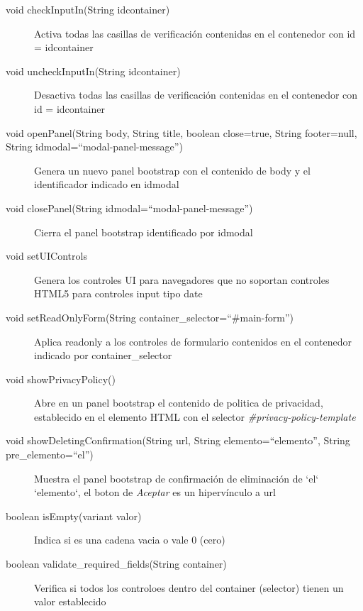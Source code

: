 \begin{description}
	\item[void checkInputIn(String idcontainer)] Activa todas las casillas de verificación contenidas en el contenedor con id = idcontainer
	\item[void uncheckInputIn(String idcontainer)] Desactiva todas las casillas de verificación contenidas en el contenedor con id = idcontainer
	\item[void openPanel(String body, String title, boolean close=true, String footer=null,]
	\item[\quad String idmodal=``modal-panel-message'')] Genera un nuevo panel bootstrap con el contenido de body y el identificador indicado en idmodal
	\item[void closePanel(String idmodal=``modal-panel-message'')] Cierra el panel bootstrap identificado por idmodal
	\item[void setUIControls] Genera los controles UI para navegadores que no soportan controles HTML5 para controles input tipo date
	\item[void setReadOnlyForm(String container\_selector=``\#main-form'')] Aplica readonly a los controles de formulario contenidos en el contenedor indicado por container\_selector
	\item [void showPrivacyPolicy()] Abre en un panel bootstrap el contenido de politica de privacidad, establecido en el elemento HTML con el selector \textit{\#privacy-policy-template}
	\item[void showDeletingConfirmation(String url, String elemento=``elemento'', String pre\_elemento=``el'')] Muestra el panel bootstrap de confirmación de eliminación de `el` `elemento`, el boton de \textit{Aceptar} es un hipervínculo a url
	\item[boolean isEmpty(variant valor)] Indica si es una cadena vacia o vale 0 (cero)
	\item[boolean validate\_required\_fields(String container)] Verifica si todos los controloes dentro del container (selector) tienen un valor establecido
\end{description}